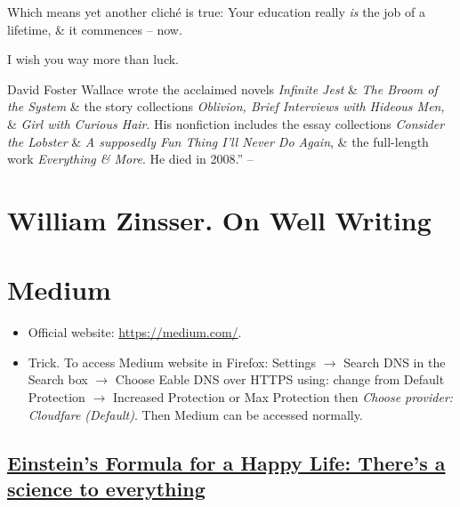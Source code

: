 \documentclass{article}
\begin{document}
Which means yet another clich\'e is true: Your education really {\it is} the job of a lifetime, \& it commences -- now.

I wish you way more than luck.

{\sc David Foster Wallace} wrote the acclaimed novels {\it Infinite Jest} \& {\it The Broom of the System} \& the story collections {\it Oblivion, Brief Interviews with Hideous Men}, \& {\it Girl with Curious Hair}. His nonfiction includes the essay collections {\it Consider the Lobster} \& {\it A supposedly Fun Thing I'll Never Do  Again}, \& the full-length work {\it Everything \& More}. He died in 2008.'' -- \cite{Wallace_water}




\section{{\sc William Zinsser}. On Well Writing}


\section{Medium}

\begin{itemize}
	\item Official website: \url{https://medium.com/}.
	\item {\sf Trick.} To access Medium website in Firefox: {\sf Settings} $\to$ Search DNS in the {\sf Search} box $\to$ Choose {\sf Eable DNS over HTTPS using}: change from {\sf Default Protection} $\to$ {\sf Increased Protection} or {\sf Max Protection} then {\it Choose provider: Cloudfare (Default)}. Then Medium can be accessed normally.
\end{itemize}


\subsection{\href{https://medium.com/mind-cafe/einsteins-formula-for-a-happy-life-b29aff61a9c7}{Einstein's Formula for a Happy Life: There's a science to everything}}
\end{document}

